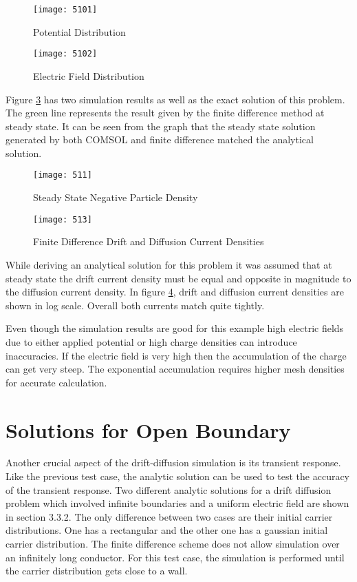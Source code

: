 \begin{doublespace}
\begin{figure}
\centering
\texttt{[image: 5101]}
\caption{Potential Distribution} 
\label{5pot}
\end{figure}

\begin{figure}
\centering
\texttt{[image: 5102]}
\caption{Electric Field Distribution} 
\label{5E}
\end{figure}

\clearpage

Figure  \ref{5ss} has two simulation results as well as the exact solution of this problem. The green line represents the result given by the finite difference method at steady state. It can be seen from the graph that the steady state solution generated by both COMSOL and finite difference matched the analytical solution.

\begin{figure}
\centering
\texttt{[image: 511]}
\caption{Steady State Negative Particle Density} 
\label{5ss}
\end{figure}

\begin{figure}[!htp]
\centering
\texttt{[image: 513]}
\caption{Finite Difference Drift and Diffusion Current Densities}
 \label{5curdens}
\end{figure}

While deriving an analytical solution for this problem it was assumed that at steady state the drift current density must be equal and opposite in magnitude to the diffusion current density. In figure \ref{5curdens}, drift and diffusion current densities are shown in log scale. Overall both currents match quite tightly.

Even though the simulation results are good for this example high electric fields due to either applied potential or high charge densities can introduce inaccuracies. If the electric field is very high then the accumulation of the charge can get very steep. The exponential accumulation requires higher mesh densities for accurate calculation.

\clearpage
\section{Solutions for Open Boundary}
Another crucial aspect of the drift-diffusion simulation is its transient response. Like the previous test case, the analytic solution can be used to test the accuracy of the transient response. Two different analytic solutions for a  drift diffusion problem which involved infinite boundaries and a uniform electric field are shown in section 3.3.2. The only difference between two cases are their initial carrier distributions. One has a rectangular and the other one has a gaussian initial carrier distribution. The finite difference scheme does not allow simulation over an infinitely long conductor. For this test case, the simulation is performed until the carrier distribution gets close to a wall.   


\end{doublespace}
